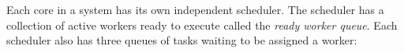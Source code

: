 %
% 




Each core in a \Grappa system has its own independent scheduler. The scheduler
has a collection of active workers ready to execute called the {\it ready
worker queue}. Each scheduler also has three queues of tasks waiting to be
assigned a worker:

